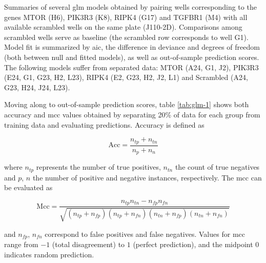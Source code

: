 \renewcommand{\arraystretch}{1.5}
\setlength{\tabcolsep}{0.25em}
\begin{table}
  \centering
  \caption[\Gls{glm} model summaries based on principal components for several well pairings.]{Summaries of several \gls{glm} models obtained by pairing wells corresponding to the genes MTOR (H6), PIK3R3 (K8), RIPK4 (G17) and TGFBR1 (M4) with all available scrambled wells on the same plate (J110-2D). Comparisons among scrambled wells serve as baseline (the scrambled row corresponds to well G1). Model fit is summarized by \gls{aic}, the difference in deviance and degrees of freedom (both between null and fitted models), as well as out-of-sample prediction scores. The following models suffer from separated data: MTOR (A24, G1, J2), PIK3R3 (E24, G1, G23, H2, L23), RIPK4 (E2, G23, H2, J2, L1) and Scrambled (A24, G23, H24, J24, L23).}
  \label{tab:glm-1}
  \footnotesize
  \vspace{5px}
  
\end{table}

Moving along to out-of-sample prediction scores, table \ref{tab:glm-1} shows both accuracy and \gls{mcc} values obtained by separating 20\% of data for each group from training data and evaluating predictions. Accuracy is defined as

\begin{equation}
  \text{Acc} = \frac{n_{tp} + n_{tn}}{n_p+n_n}
\end{equation}

where $n_{tp}$ represents the number of true positives, $n_{tn}$ the count of true negatives and $p$, $n$ the number of positive and negative instances, respectively. The \acrshort{mcc} \citep{Matthews1975} can be evaluated as

\begin{equation}
  \text{Mcc} = \frac{n_{tp} n_{tn} - n_{fp} n_{fn}}{\sqrt{(n_{tp} + n_{fp})(n_{tp} + n_{fn})(n_{tn} + n_{fp})(n_{tn} + n_{fn})}}
\end{equation}

and $n_{fp}$, $n_{fn}$ correspond to false positives and false negatives. Values for \gls{mcc} range from $-1$ (total disagreement) to $1$ (perfect prediction), and the midpoint $0$ indicates random prediction.

